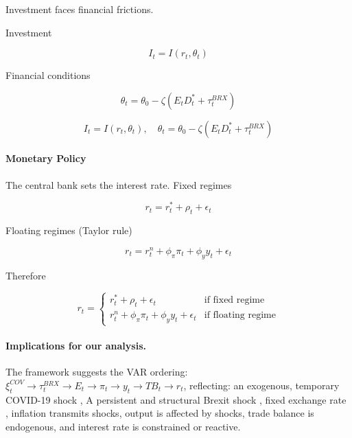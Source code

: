 \documentclass[
]{article}
\begin{document}
	Investment faces financial frictions.
	
	Investment
	
	\begin{equation*}
		I_t = I(r_t, \theta_t)
	\end{equation*}
	
	Financial conditions
	
	\begin{equation*}
		\theta_t = \theta_0 - \zeta (E_t D_t^* + \tau_t^{BRX})
	\end{equation*}
	
	\begin{equation}
		I_t = I(r_t, \theta_t), \quad \theta_t = \theta_0 - \zeta (E_t D_t^* + \tau_t^{BRX})
		\label{eq:bs}
	\end{equation}
	
	\paragraph*{Monetary Policy}
	
	The central bank sets the interest rate. Fixed regimes
	
	\begin{equation*}
		r_t = r_t^* + \rho_t + \epsilon_t
	\end{equation*}
	
	Floating regimes (Taylor rule)
	
	\begin{equation*}
		r_t = r_t^n + \phi_\pi \pi_t + \phi_y y_t + \epsilon_t
	\end{equation*}
	
	Therefore 
	
	\begin{equation}
		r_t =
		\begin{cases} 
			r_t^* + \rho_t + \epsilon_t & \text{if fixed regime} \\
			r_t^n + \phi_\pi \pi_t + \phi_y y_t + \epsilon_t & \text{if floating regime}
		\end{cases}
		\label{eq:taylor}
	\end{equation}
	
	\paragraph*{Implications for our analysis.} 
	The framework suggests the VAR ordering: 
	\( \xi_t^{COV} \rightarrow \tau_t^{BRX} \rightarrow E_t \rightarrow \pi_t \rightarrow y_t \rightarrow TB_t \rightarrow r_t \), reflecting:
	an exogenous, temporary COVID-19 shock %
	, A persistent and structural Brexit shock %
	, fixed exchange rate %
	, inflation transmits shocks,%
	output is affected by shocks,%
	trade balance is endogenous,%
	and interest rate is constrained or reactive.%
	
	
	
\end{document}
